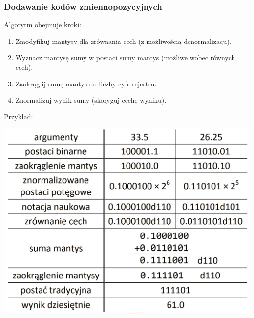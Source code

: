\documentclass[12pt]{article}
\begin{document}
    \subsubsection{Dodawanie kodów zmiennopozycyjnych}
    Algorytm obejmuje kroki:
    \begin{enumerate}
        \item Zmodyfikuj mantysy dla zrównania cech (z możliwością
        denormalizacji).
        \item Wyznacz mantysę sumy w postaci sumy mantys (możliwe wobec równych cech).
        \item Zaokrąglij sumę mantys do liczby cyfr rejestru.
        \item Znormalizuj wynik sumy (skoryguj cechę wyniku).
    \end{enumerate}
    Przykład:\\
    \begin{center}
        \includegraphics[scale=0.3]{graphics/number-repr/fl-pt-add.png}
    \end{center}
    
\end{document}
